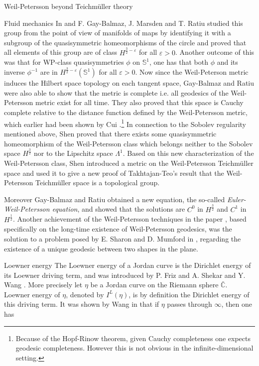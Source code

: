 \documentclass[12pt]{amsart}
\newcommand{\sphere}{\bar{\Bbb{C}}} %
\renewcommand{\Bbb}[1]{\ensuremath{\mathbb{#1}}}
\theoremstyle{plain}
\theoremstyle{definition}
\theoremstyle{remark}
\numberwithin{equation}{section} %
\numberwithin{figure}{section} %
\begin{document}
\begin{section}{Weil-Petersson beyond Teichm\"uller theory}
\begin{subsection}{Fluid mechanics}
In \cite{GMR} and \cite{GR} F. Gay-Balmaz, J. Marsden and T. Ratiu studied this group from the point of view of
manifolds of maps by identifying it with a subgroup of the quasisymmetric homeomorphisms of the circle and proved that all elements of this group are of class \(H^{\frac{3}{2}-\varepsilon}\) for all
\(\varepsilon>0\). Another outcome of this was that for WP-class quasisymmetries $\phi$ on $\mathbb{S}^1$, one has that both $\phi$ and its inverse $\phi^{-1}$ are in $H^{\frac{3}{2}-\varepsilon}(\mathbb{S}^1)$ for all $\varepsilon >0$. Now since the Weil-Peterson metric induces the Hilbert space topology on each tangent space, Gay-Balmaz and Ratiu were also able to show that the metric is complete i.e. all geodesics of the Weil-Petersson metric exist for all time. They also proved that this space is Cauchy complete relative to the distance function defined by the Weil-Petersson metric, which earlier had been shown by Cui \cite{Cui}.\footnote{Because of the Hopf-Rinow theorem, given Cauchy completeness one expects geodesic completeness. However this is not obvious in the infinite-dimensional setting.} 
In connection to the Sobolev regularity mentioned above, Shen \cite{Shen_characterization} proved that there exists some quasisymmetric homeomorphism of the Weil-Petersson class
which belongs neither to the Sobolev space \(H^{\frac{3}{2}}\) nor to the Lipschitz space \(\Lambda^{1}\). Based on
this new characterization of the Weil-Petersson class, Shen introduced a metric on the Weil-Petersson Teichmüller space and used it to give a new proof of Takhtajan-Teo's result that the Weil-Petersson Teichmüller space is a topological group.

Moreover {Gay-Balmaz and Ratiu} obtained a new equation, the so-called {\it{Euler-Weil-Petersson equation}}, and showed that the solutions are \(C^{0}\) in \(H^{\frac{3}{2}}\)
and \(C^{1}\) in \(H^{\frac{1}{2}}\).  Another achievement of the Weil-Petersson techniques in the paper \cite{Gay}, based specifically on the long-time existence of Weil-Petersson geodesics, was the solution to a problem posed by E. Sharon and D. Mumford in \cite{SharonMumford}, regarding the existence of a unique geodesic between two shapes in the plane.
     \end{subsection}
     \begin{subsection}{Loewner energy}\label{Loewner subsection}
The Loewner energy of a Jordan curve is the Dirichlet energy of its Loewner driving term, and was introduced by P. Friz and A. Shekar \cite{FrizShekar} and Y. Wang \cite{Wang}. More precisely let \(\eta\) be a Jordan curve on the Riemann sphere $\sphere.$ Loewner energy of \(\eta\), denoted by $I^{L}(\eta)$, is by definition the Dirichlet energy of this driving term. It was shown by Wang in \cite{Wang} that if \(\eta\) passes through \(\infty\), then one has


\end{subsection}
\end{section}
\end{document}
